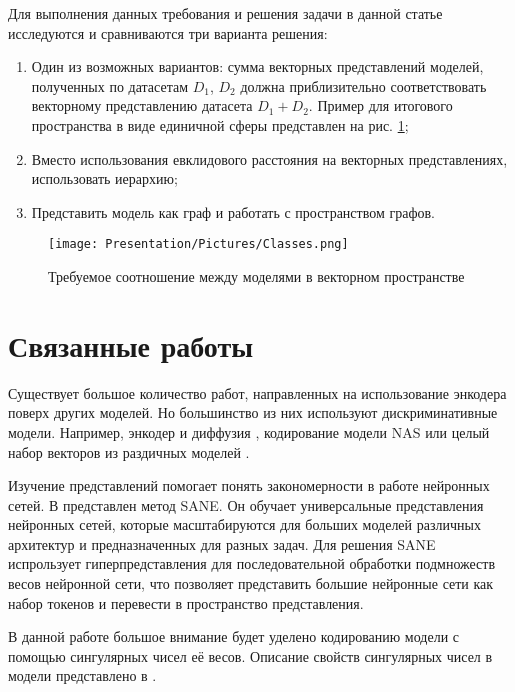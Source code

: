 \documentclass[a4paper, 14pt]{article}
\begin{document}
Для выполнения данных требования и решения задачи в данной статье исследуются и сравниваются три варианта решения:

\begin{enumerate}
    \item Один из возможных вариантов: сумма векторных представлений моделей, полученных по датасетам $D_1$, $D_2$ должна приблизительно соответствовать векторному представлению датасета $D_1 + D_2$. Пример для итогового пространства в виде единичной сферы представлен на рис. \ref{fg:classes};
    
    \item Вместо использования евклидового расстояния на векторных представлениях, использовать иерархию;
    
    \item Представить модель как граф и работать с пространством графов.
\end{enumerate}

\begin{figure}
    \begin{center}
    \texttt{[image: Presentation/Pictures/Classes.png]}
    \caption{Требуемое соотношение между моделями в векторном пространстве}
    \label{fg:classes}
    \end{center}
\end{figure}

\section{Связанные работы}
Существует большое количество работ, направленных на использование энкодера поверх других моделей. Но большинство из них используют дискриминативные модели. Например, энкодер и диффузия \citep{Encoder_diffusion}, кодирование модели NAS \citep{NAS} или целый набор векторов из раздичных моделей \citep{TANS}.

Изучение представлений помогает понять закономерности в работе нейронных сетей. В \citep{SANE} представлен метод SANE. Он обучает универсальные представления нейронных сетей, которые масштабируются для больших моделей различных архитектур и предназначенных для разных задач. Для решения SANE испрользует гиперпредставления для последовательной обработки подмножеств весов нейронной сети, что позволяет представить большие нейронные сети как набор токенов и перевести в пространство представления.

В данной работе большое внимание будет уделено кодированию модели с помощью сингулярных чисел её весов. Описание свойств сингулярных чисел в модели представлено в \citep{Singular}.
\end{document}

